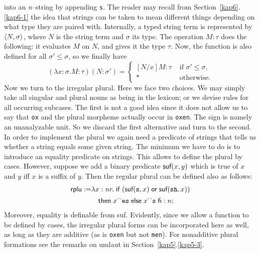 into an {\it n\/}--string by appending {\tt s}. The reader may recall 
from Section~\ref{kap6}.\ref{kap6-1} the idea that strings can be taken 
to mean different things depending on what type they are paired with. 
Internally, a typed string term is represented by $\langle N, \sigma\rangle$, 
where $N$ is the string term and $\sigma$ its type. The operation 
$M : \tau$ does the following: it evaluates $M$ on $N$, and gives it 
the type $\tau$.  Now, the function is also defined for all 
$\sigma' \leq \sigma$, so we finally have
\begin{equation}
(\lambda x:\sigma.M:\tau)(N : \sigma')
    = \begin{cases}
    [N/x]M : \tau & \text{ if $\sigma' \leq
        \sigma$,} \\
    \ast & \text{ otherwise.}
    \end{cases}
\end{equation}
Now we turn to the irregular plural. Here we face two choices.
We may simply take all singular and plural nouns as being in the
lexicon; or we devise rules for all occurring subcases. The
first is not a good idea since it does not allow us to say that
{\tt ox} and the plural morpheme actually occur in {\tt oxen}.
The sign is namely an unanalyzable unit. So we discard the first
alternative and turn to the second. In order to implement the
plural we again need a predicate of strings that tells us whether
a string equals some given string. The minimum we have to do is
to introduce an equality predicate on strings. This allows to define
the plural by cases. However, suppose we add a binary predicate
$\mbox{\sf suf}(x,y)$ which is true of $x$ and $y$ iff
$x$ is a suffix of $y$. Then the regular plural can be defined
also as follows:
\begin{align}
\mbox{\sf rplu} := 
	& \lambda x : \mbox{\it nr}.\; \mbox{\sf if } %
	(\mbox{\sf suf}(\mbox{\tt s}, x)\;  
	        \mbox{\sf or}\; \mbox{\sf suf}(\mbox{\tt sh}, x)) \\\notag
	& \quad
     		\mbox{\sf then} \;
    x\conc\mbox{\tt es} \; 
	\mbox{\sf else}\; x \conc \mbox{\tt s}\;
	\mbox{\sf fi} : n;
\end{align}
Moreover, equality is definable from {\sf suf}. Evidently, since 
we allow a function to be defined by cases, the irregular plural forms 
can be incorporated here as well, as long as they are additive 
(as is {\tt oxen} but not {\tt men}). For nonadditive plural 
formations see the remarks on umlaut in Section~\ref{kap5}.\ref{kap5-3}.

